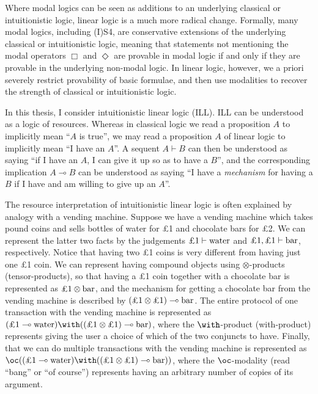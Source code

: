 Where modal logics can be seen as additions to an underlying classical or
intuitionistic logic, linear logic is a much more radical change.
Formally, many modal logics, including (I)S4, are conservative extensions of
the underlying classical or intuitionistic logic, meaning that statements not
mentioning the modal operators $\Box$ and $\Diamond$ are provable in modal logic
if and only if they are provable in the underlying non-modal logic.
In linear logic, however, we a priori severely restrict provability of basic
formulae, and then use modalities to recover the strength of classical or
intuitionistic logic.

In this thesis, I consider intuitionistic linear logic (ILL).
ILL can be understood as a logic of resources.
Whereas in classical logic we read a proposition $A$ to implicitly mean ``$A$ is
true'', we may read a proposition $A$ of linear logic to implicitly mean ``I
have an $A$''.
A sequent $A \vdash B$ can then be understood as saying ``if I have an $A$, I
can give it up so as to have a $B$'', and the corresponding implication
$A \multimap B$ can be understood as saying ``I have a \emph{mechanism} for
having a $B$ if I have and am willing to give up an $A$''.

The resource interpretation of intuitionistic linear logic is often explained by
analogy with a vending machine.
Suppose we have a vending machine which takes pound coins and sells bottles of
water for \pounds{}1 and chocolate bars for \pounds{}2.
We can represent the latter two facts by the judgements
$\textrm{\pounds}1 \vdash \mathrm{water}$ and
$\textrm{\pounds}1, \textrm{\pounds}1 \vdash \mathrm{bar}$, respectively.
Notice that having two \pounds{}1 coins is very different from having just one
\pounds{}1 coin.
We can represent having compound objects using $\otimes$-products
(tensor-products), so that having a \pounds{}1 coin together with a chocolate
bar is represented as $\textrm{\pounds}1\otimes\mathrm{bar}$, and the mechanism
for getting a chocolate bar from the vending machine is described by
$\plr{\textrm{\pounds}1 \otimes \textrm{\pounds}1} \multimap \mathrm{bar}$.
The entire protocol of one transaction with the vending machine is represented
as
$\plr{\textrm{\pounds}1 \multimap \mathrm{water}} \with
\plr{\plr{\textrm{\pounds}1 \otimes \textrm{\pounds}1} \multimap \mathrm{bar}}$,
where the $\with$-product (with-product) represents giving the user a choice of
which of the two conjuncts to have.
Finally, that we can do multiple transactions with the vending machine is
represented as
$\oc\plr{\plr{\textrm{\pounds}1 \multimap \mathrm{water}} \with
\plr{\plr{\textrm{\pounds}1 \otimes \textrm{\pounds}1} \multimap \mathrm{bar}}}
$, where the $\oc$-modality (read ``bang'' or ``of course'') represents having
an arbitrary number of copies of its argument.

